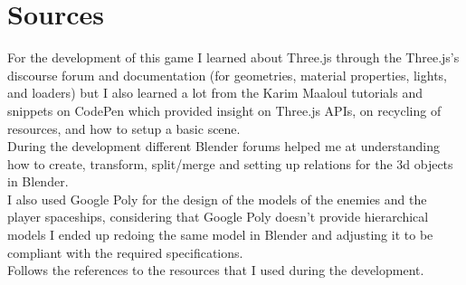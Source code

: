 \documentclass[a4paper,11pt]{article}
\begin{document}
\section{Sources}
For the development of this game I learned about Three.js through the Three.js's discourse forum and documentation (for geometries, material properties, lights, and loaders) but I also learned a lot from the Karim Maaloul tutorials and snippets on CodePen which provided insight on Three.js APIs, on recycling of resources, and how to setup a basic scene.\\
During the development different Blender forums helped me at understanding how to create, transform, split/merge and setting up relations for the 3d objects in Blender.\\ 
I also used Google Poly for the design of the models of the enemies and the player spaceships, considering that Google Poly doesn't provide hierarchical models I ended up redoing the same model in Blender and adjusting it to be compliant with the required specifications.\\
Follows the references to the resources that I used during the development.\\
\end{document}
